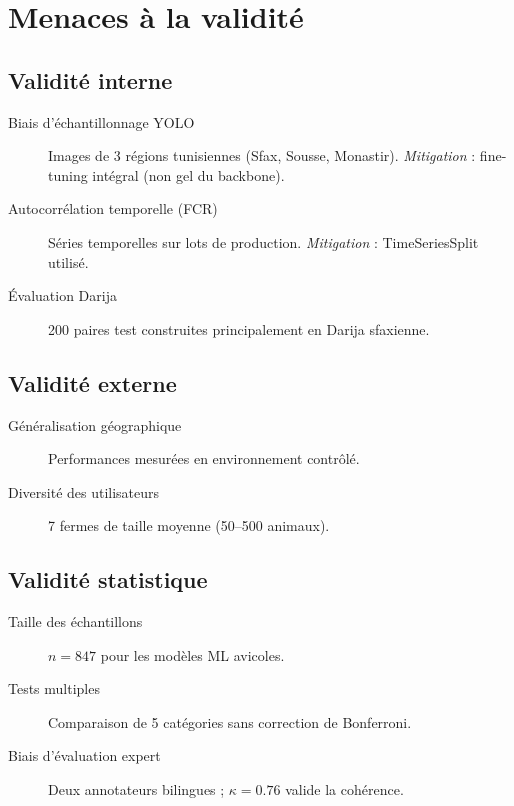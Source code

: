 \documentclass[12pt,a4paper,twoside]{report}
\newcounter{hi}
\begin{document}
\section{Menaces à la validité}

\subsection{Validité interne}

\begin{description}
  \item[Biais d'échantillonnage YOLO] Images de 3 régions tunisiennes (Sfax, Sousse, Monastir).
        \textit{Mitigation} : fine-tuning intégral (non gel du backbone).
  \item[Autocorrélation temporelle (FCR)] Séries temporelles sur lots de production.
        \textit{Mitigation} : TimeSeriesSplit utilisé.
  \item[Évaluation Darija] 200 paires test construites principalement en Darija sfaxienne.
\end{description}

\subsection{Validité externe}

\begin{description}
  \item[Généralisation géographique] Performances mesurées en environnement contrôlé.
  \item[Diversité des utilisateurs] 7 fermes de taille moyenne (50--500 animaux).
\end{description}

\subsection{Validité statistique}

\begin{description}
  \item[Taille des échantillons] $n = 847$ pour les modèles ML avicoles.
  \item[Tests multiples] Comparaison de 5 catégories sans correction de Bonferroni.
  \item[Biais d'évaluation expert] Deux annotateurs bilingues ; $\kappa = 0.76$ valide la cohérence.
\end{description}
\end{document}
